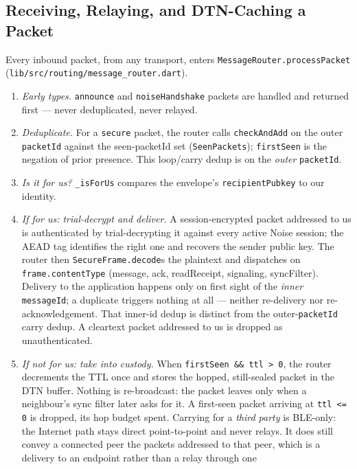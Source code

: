 \documentclass[11pt]{report}
\newcommand{\code}[1]{\texttt{\small #1}}
\begin{document}
\subsection{Receiving, Relaying, and DTN-Caching a Packet}

Every inbound packet, from any transport, enters
\code{MessageRouter.processPacket}
(\code{lib/src/routing/message\_router.dart}).

\begin{enumerate}
  \item \emph{Early types.} \code{announce} and \code{noiseHandshake} packets
    are handled and returned first --- never deduplicated, never relayed.
  \item \emph{Deduplicate.} For a \code{secure} packet, the router calls
    \code{checkAndAdd} on the outer \code{packetId} against the seen-packetId set
    (\code{SeenPackets}); \code{firstSeen} is the negation of prior presence.
    This loop/carry dedup is on the \emph{outer} \code{packetId}.
  \item \emph{Is it for us?} \code{\_isForUs} compares the envelope's
    \code{recipientPubkey} to our identity.
  \item \emph{If for us: trial-decrypt and deliver.} A session-encrypted packet
    addressed to us is authenticated by trial-decrypting it against every active
    Noise session; the AEAD tag identifies the right one and recovers the sender
    public key. The router then \code{SecureFrame.decode}s the plaintext and
    dispatches on \code{frame.contentType} (message, ack, readReceipt,
    signaling, syncFilter). Delivery to the application happens
    only on first sight of the \emph{inner} \code{messageId}; a duplicate
    triggers nothing at all --- neither re-delivery nor re-acknowledgement.
    That inner-id dedup is distinct from the outer-\code{packetId} carry
    dedup. A cleartext packet addressed to us is dropped as unauthenticated.
  \item \emph{If not for us: take into custody.} When \code{firstSeen \&\& ttl > 0},
    the router decrements the TTL once and stores the hopped, still-sealed
    packet in the DTN buffer. Nothing is re-broadcast: the packet leaves only
    when a neighbour's sync filter later asks for it. A first-seen packet
    arriving at \code{ttl <= 0} is dropped, its hop budget spent. Carrying for a \emph{third
    party} is BLE-only: the Internet path stays direct point-to-point and never
    relays. It does still convey a connected peer the packets addressed to that
    peer, which is a delivery to an endpoint rather than a relay through one

\end{enumerate}
\end{document}
